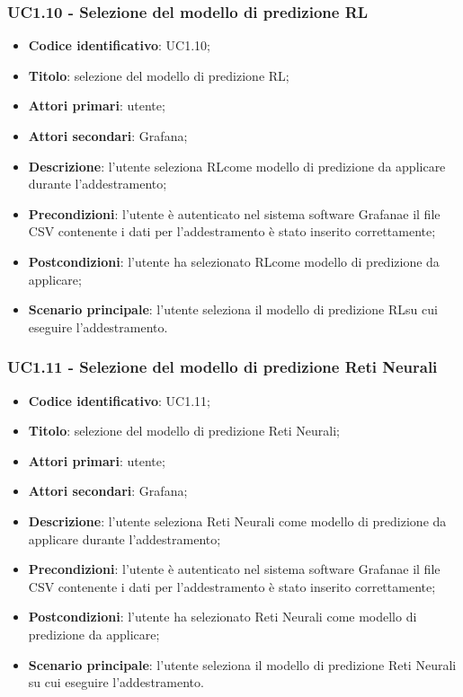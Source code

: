 \subsubsection{UC1.10 - Selezione del modello di predizione RL}
\begin{itemize}
	\item \textbf{Codice identificativo}: UC1.10;
	\item \textbf{Titolo}: selezione del modello di predizione RL\glo;
	\item \textbf{Attori primari}: utente;
	\item \textbf{Attori secondari}: Grafana\glo;
	\item \textbf{Descrizione}: l'utente seleziona RL\glosp come modello di predizione da applicare durante l'addestramento;
	\item \textbf{Precondizioni}: l'utente è autenticato nel sistema software Grafana\glosp e il file CSV contenente i dati per l'addestramento è stato inserito correttamente;
	\item \textbf{Postcondizioni}: l'utente ha selezionato RL\glosp come modello di predizione da applicare;
	\item \textbf{Scenario principale}: l'utente seleziona il modello di predizione RL\glosp su cui eseguire l'addestramento.
\end{itemize}
\subsubsection{UC1.11 - Selezione del modello di predizione Reti Neurali}
\begin{itemize}
	\item \textbf{Codice identificativo}: UC1.11;
	\item \textbf{Titolo}: selezione del modello di predizione Reti Neurali;
	\item \textbf{Attori primari}: utente;
	\item \textbf{Attori secondari}: Grafana\glo;
	\item \textbf{Descrizione}: l'utente seleziona Reti Neurali come modello di predizione da applicare durante l'addestramento;
	\item \textbf{Precondizioni}: l'utente è autenticato nel sistema software Grafana\glosp e il file CSV contenente i dati per l'addestramento è stato inserito correttamente;
	\item \textbf{Postcondizioni}: l'utente ha selezionato Reti Neurali come modello di predizione da applicare;
	\item \textbf{Scenario principale}: l'utente seleziona il modello di predizione Reti Neurali su cui eseguire l'addestramento.
\end{itemize}
